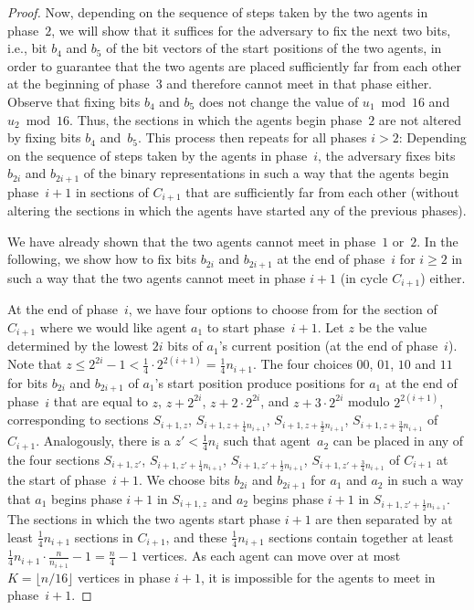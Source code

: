 \documentclass[10pt,a4paper]{article}
\begin{document}
{\begin{proof}
    Now, depending on the sequence of steps taken by the two agents in
    phase~$2$, we will show that it suffices for the adversary to fix the next
    two bits, i.e., bit $b_4$ and $b_5$ of the bit vectors of the start
    positions of the two agents, in order to guarantee that the two agents are
    placed sufficiently far from each other at the beginning of phase~$3$ and
    therefore cannot meet in that phase either. Observe that fixing bits $b_4$
    and $b_5$ does not change the value of $u_1\bmod 16$ and $u_2\bmod 16$.
    Thus, the sections in which the agents begin phase~$2$ are not altered by
    fixing bits $b_4$ and~$b_5$. This process then repeats for all phases $i>2$:
    Depending on the sequence of steps taken by the agents in phase~$i$, the
    adversary fixes bits $b_{2i}$ and $b_{2i+1}$ of the binary representations
    in such a way that the agents begin phase~$i+1$ in sections of $C_{i+1}$
    that are sufficiently far from each other (without altering the sections in
    which the agents have started any of the previous phases).

    We have already shown that the two agents cannot meet in phase~$1$ or~$2$.
    In the following, we show how to fix bits $b_{2i}$ and $b_{2i+1}$ at the end
    of phase~$i$ for $i\ge 2$ in such a way that the two agents cannot meet in
    phase $i+1$ (in cycle $C_{i+1}$) either.
	
   At the end of phase~$i$, we have four options to choose from for the section
   of $C_{i+1}$ where we would like agent $a_1$ to start phase~$i+1$. Let $z$ be
   the value determined by the lowest $2i$ bits of $a_1$'s current position (at
   the end of phase~$i$). Note that $z\le 2^{2i}-1<\frac14\cdot
   2^{2(i+1)}=\frac14 n_{i+1}$. The four choices $00$, $01$, $10$ and $11$ for
   bits $b_{2i}$ and $b_{2i+1}$ of $a_1$'s start position produce positions for
   $a_1$ at the end of phase~$i$ that are equal to $z$, $z+2^{2i}$, $z+2\cdot
   2^{2i}$, and $z+3\cdot 2^{2i}$ modulo $2^{2(i+1)}$, corresponding to sections
   $S_{i+1,z}$, $S_{i+1,z+\frac14 n_{i+1}}$, $S_{i+1,z+\frac12 n_{i+1}}$,
   $S_{i+1,z+\frac34 n_{i+1}}$ of $C_{i+1}$. Analogously, there is a $z'<\frac14
   n_i$ such that agent~$a_2$ can be placed in any of the four sections
   $S_{i+1,z'}$, $S_{i+1,z'+\frac14 n_{i+1}}$, $S_{i+1,z'+\frac12 n_{i+1}}$,
   $S_{i+1,z'+\frac34 n_{i+1}}$ of $C_{i+1}$ at the start of phase~$i+1$. We
   choose bits $b_{2i}$ and $b_{2i+1}$ for $a_1$ and $a_2$ in such a way that
   $a_1$ begins phase $i+1$ in $S_{i+1,z}$ and $a_2$ begins phase $i+1$ in
   $S_{i+1,z'+\frac12 n_{i+1}}$. The sections in which the two agents start
   phase $i+1$ are then separated by at least $\frac14 n_{i+1}$ sections in
   $C_{i+1}$, and these $\frac14 n_{i+1}$ sections contain together at least
   $\frac14 n_{i+1} \cdot \frac{n}{n_{i+1}} - 1 = \frac{n}{4}-1$ vertices. As
   each agent can move over at most $K=\lfloor n/16\rfloor$ vertices in phase
   $i+1$, it is impossible for the agents to meet in phase~$i+1$.


\end{proof}}
\end{document}
